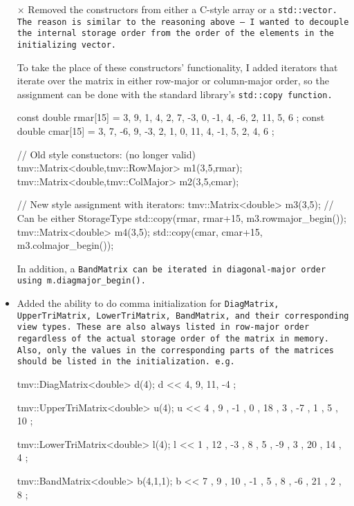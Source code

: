 \begin{itemize}
\item[$\times$] 
Removed the constructors from either a C-style array or a \tt{std::vector}.  The reason is similar to the reasoning above -- I wanted to decouple the internal storage order from the order of the elements in the initializing vector. 

To take the place of these constructors' functionality, I added iterators that iterate over the matrix in either row-major or column-major order, so the assignment can be done with the standard library's \tt{std::copy} function.

\begin{tmvcode}
const double rmar[15] = 
    { 3, 9, 1, 4, 2, 7, -3, 0, -1, 4, -6, 2, 11, 5, 6 };
const double cmar[15] = 
    { 3, 7, -6, 9, -3, 2, 1, 0, 11, 4, -1, 5, 2, 4, 6 };

// Old style constuctors: (no longer valid)
tmv::Matrix<double,tmv::RowMajor> m1(3,5,rmar);
tmv::Matrix<double,tmv::ColMajor> m2(3,5,cmar);

// New style assignment with iterators:
tmv::Matrix<double> m3(3,5); // Can be either StorageType
std::copy(rmar, rmar+15, m3.rowmajor_begin());
tmv::Matrix<double> m4(3,5);
std::copy(cmar, cmar+15, m3.colmajor_begin());
\end{tmvcode}

In addition, a \tt{BandMatrix} can be iterated in diagonal-major order using \tt{m.diagmajor\_begin()}.

\item 
Added the ability to do comma initialization for \tt{DiagMatrix}, \tt{UpperTriMatrix}, \tt{LowerTriMatrix}, \tt{BandMatrix}, and their corresponding view types.  These are also always listed in row-major order regardless of the actual storage order of the matrix in memory.  Also, only the values in the corresponding parts of the matrices should be listed in the initialization.  e.g.
\begin{tmvcode}
tmv::DiagMatrix<double> d(4);
d << 4,
        9,
           11,
              -4 ;
              
tmv::UpperTriMatrix<double> u(4);
u << 4 ,  9 , -1 ,  0 ,
         18 ,  3 , -7 ,
               1 ,  5 ,
                   10 ;
                   
tmv::LowerTriMatrix<double> l(4);
l <<  1 ,
     12 , -3 ,
      8 ,  5 , -9 ,
      3 , 20 , 14 ,  4 ;
      
tmv::BandMatrix<double> b(4,1,1);
b <<  7 ,  9 ,
     10 , -1 ,  5 ,
           8 , -6 , 21 ,
                2 ,  8 ;
\end{tmvcode}


\end{itemize}
